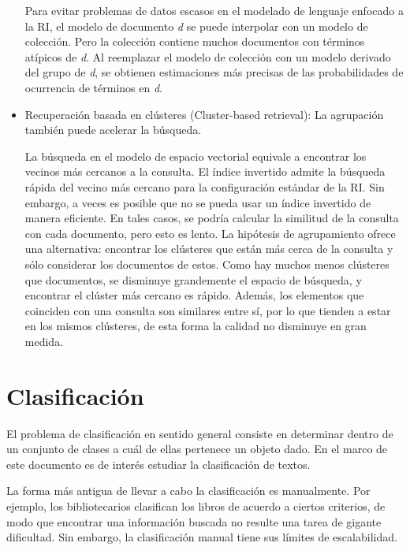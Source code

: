 \documentclass{llncs}
\begin{document}
\begin{itemize}
 	Para evitar problemas de datos escasos en el modelado de lenguaje enfocado a la RI, el modelo de documento \textit{d} se puede interpolar con un modelo de colección. Pero la colección contiene muchos documentos con términos atípicos de \textit{d}. Al reemplazar el modelo de colección con un modelo derivado del grupo de \textit{d}, se obtienen estimaciones más precisas de las probabilidades de ocurrencia de términos en \textit{d}.
	
	\item Recuperaci\'on basada en cl\'usteres (Cluster-based retrieval): La agrupación también puede acelerar la búsqueda. 
	
	La búsqueda en el modelo de espacio vectorial equivale a encontrar los vecinos más cercanos a la consulta. El índice invertido admite la búsqueda rápida del vecino más cercano para la configuración estándar de la RI. Sin embargo, a veces es posible que no se pueda usar un índice invertido de manera eficiente. En tales casos, se podr\'ia calcular la similitud de la consulta con cada documento, pero esto es lento. La hipótesis de agrupamiento ofrece una alternativa: encontrar los cl\'usteres que están más cerca de la consulta y sólo considerar los documentos de estos. Como hay muchos menos clústeres que documentos, se disminuye grandemente el espacio de b\'usqueda, y encontrar el clúster más cercano es rápido. Adem\'as, los elementos que coinciden con una consulta son similares entre sí, por lo que tienden a estar en los mismos cl\'usteres, de esta forma la calidad no disminuye en gran medida.
\end{itemize}

\section{Clasificaci\'on}

	El problema de clasificaci\'on en sentido general consiste en determinar dentro de un conjunto de clases a cu\'al de ellas pertenece un objeto dado. En el marco de este documento es de inter\'es estudiar la clasificaci\'on de textos. 
	
%	
	La forma m\'as antigua de llevar a cabo la clasificaci\'on es manualmente. Por ejemplo, los bibliotecarios clasifican los libros de acuerdo a ciertos criterios, de modo que encontrar una informaci\'on buscada no resulte una tarea de gigante dificultad. Sin embargo, la clasificaci\'on manual tiene sus l\'imites de escalabilidad. 
	
\end{document}
